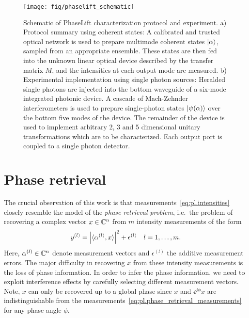 \begin{figure*}[tbp]
  \centering
  \texttt{[image: fig/phaselift\_schematic]}%
  \caption{%
    \label{fig:pl.experimental.schematic}%
     Schematic of PhaseLift characterization protocol and experiment.
     a) Protocol summary using coherent states:
     A calibrated and trusted optical network is used to prepare multimode coherent states ${|{\alpha}\rangle}$, sampled from an appropriate ensemble.
     These states are then fed into the unknown linear optical device described by the transfer matrix $M$, and the intensities at each output mode are measured.
     b) Experimental implementation using single photon sources:
     Heralded single photons are injected into the bottom waveguide of a six-mode integrated photonic device.
     A cascade of Mach-Zehnder interferometers is used to prepare single-photon states ${|{\psi( \alpha)}\rangle}$ over the bottom five modes of the device.
     The remainder of the device is used to implement arbitrary 2, 3 and 5 dimensional unitary transformations which are to be characterized.
     Each output port is coupled to a single photon detector.
   }
\end{figure*}

\section{Phase retrieval}%
\label{sec:pl.phase_retrieval}

The crucial observation of this work is that measurements~\eqref{eq:pl.intensities} closely resemble the model of the \textit{phase retrieval problem}, i.e.\ the problem of recovering a complex vector ${x} \in {\mathbb{C}}^n$ from $m$ intensity measurements of the form
\[
  y^{(l)}= {\left\vert\braket{\alpha^{(l)}, x}\right\vert}^2 + \epsilon^{(l)}
  \quad l=1,\ldots,m.
  \label{eq:pl.phase_retrieval_measurements}
\]
Here, $\alpha^{(l)} \in {\mathbb{C}}^n$ denote measurement vectors and $\epsilon^{(l)}$ the additive measurement errors.
The major difficulty in recovering $x$ from these intensity measurements is the loss of phase information.
In order to infer the phase information, we need to exploit interference effects by carefully selecting different measurement vectors.
Note, $x$ can only be recovered up to a global phase since $x$ and $\ee^{\ii\phi} x$ are indistinguishable from the measurements~\eqref{eq:pl.phase_retrieval_measurements} for any phase angle $\phi$.

